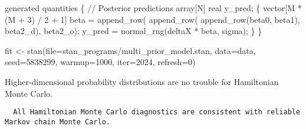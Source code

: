 \documentclass[
  letterpaper,
  DIV=11,
  numbers=noendperiod]{scrartcl}
\newenvironment{Shaded}{\begin{snugshade}}{\end{snugshade}}
\newcommand{\AttributeTok}[1]{\textcolor[rgb]{0.40,0.45,0.13}{#1}}
\newcommand{\CommentTok}[1]{\textcolor[rgb]{0.37,0.37,0.37}{#1}}
\newcommand{\DataTypeTok}[1]{\textcolor[rgb]{0.68,0.00,0.00}{#1}}
\newcommand{\DecValTok}[1]{\textcolor[rgb]{0.68,0.00,0.00}{#1}}
\newcommand{\FunctionTok}[1]{\textcolor[rgb]{0.28,0.35,0.67}{#1}}
\newcommand{\KeywordTok}[1]{\textcolor[rgb]{0.00,0.23,0.31}{#1}}
\newcommand{\NormalTok}[1]{\textcolor[rgb]{0.00,0.23,0.31}{#1}}
\newcommand{\OtherTok}[1]{\textcolor[rgb]{0.00,0.23,0.31}{#1}}
\newcommand{\SpecialCharTok}[1]{\textcolor[rgb]{0.37,0.37,0.37}{#1}}
\newcommand{\StringTok}[1]{\textcolor[rgb]{0.13,0.47,0.30}{#1}}
\begin{document}
\begin{codelisting}
\begin{Shaded}
\begin{Highlighting}[]
\KeywordTok{generated quantities}\NormalTok{ \{}
  \CommentTok{// Posterior predictions}
  \DataTypeTok{array}\NormalTok{[N] }\DataTypeTok{real}\NormalTok{ y\_pred;}
\NormalTok{  \{}
    \DataTypeTok{vector}\NormalTok{[M * (M + }\DecValTok{3}\NormalTok{) / }\DecValTok{2}\NormalTok{ + }\DecValTok{1}\NormalTok{] beta}
\NormalTok{      = append\_row(}
\NormalTok{          append\_row(}
\NormalTok{            append\_row(beta0, beta1), }
\NormalTok{          beta2\_d),}
\NormalTok{        beta2\_o);}
\NormalTok{    y\_pred = normal\_rng(deltaX * beta, sigma);}
\NormalTok{  \}}
\NormalTok{\}}
\end{Highlighting}
\end{Shaded}

\end{codelisting}

\begin{Shaded}
\begin{Highlighting}[]
\NormalTok{fit }\OtherTok{\textless{}{-}} \FunctionTok{stan}\NormalTok{(}\AttributeTok{file=}\StringTok{\textquotesingle{}stan\_programs/multi\_prior\_model.stan\textquotesingle{}}\NormalTok{,}
            \AttributeTok{data=}\NormalTok{data, }\AttributeTok{seed=}\DecValTok{5838299}\NormalTok{,}
            \AttributeTok{warmup=}\DecValTok{1000}\NormalTok{, }\AttributeTok{iter=}\DecValTok{2024}\NormalTok{, }\AttributeTok{refresh=}\DecValTok{0}\NormalTok{)}
\end{Highlighting}
\end{Shaded}

Higher-dimensional probability distributions are no trouble for
Hamiltonian Monte Carlo.

\begin{Shaded}
\end{Shaded}

\begin{verbatim}
  All Hamiltonian Monte Carlo diagnostics are consistent with reliable
Markov chain Monte Carlo.
\end{verbatim}
\end{document}
